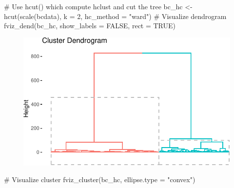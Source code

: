 \documentclass[
  letterpaper,
  DIV=11,
  numbers=noendperiod]{scrreprt}
\newenvironment{Shaded}{\begin{snugshade}}{\end{snugshade}}
\newcommand{\AttributeTok}[1]{\textcolor[rgb]{0.40,0.45,0.13}{#1}}
\newcommand{\CommentTok}[1]{\textcolor[rgb]{0.37,0.37,0.37}{#1}}
\newcommand{\ConstantTok}[1]{\textcolor[rgb]{0.56,0.35,0.01}{#1}}
\newcommand{\DecValTok}[1]{\textcolor[rgb]{0.68,0.00,0.00}{#1}}
\newcommand{\FunctionTok}[1]{\textcolor[rgb]{0.28,0.35,0.67}{#1}}
\newcommand{\NormalTok}[1]{\textcolor[rgb]{0.00,0.23,0.31}{#1}}
\newcommand{\OtherTok}[1]{\textcolor[rgb]{0.00,0.23,0.31}{#1}}
\newcommand{\StringTok}[1]{\textcolor[rgb]{0.13,0.47,0.30}{#1}}
\begin{document}
\begin{Shaded}
\begin{Highlighting}[]
\CommentTok{\# Use hcut() which compute hclust and cut the tree}
\NormalTok{bc\_hc }\OtherTok{\textless{}{-}} \FunctionTok{hcut}\NormalTok{(}\FunctionTok{scale}\NormalTok{(bcdata), }\AttributeTok{k =} \DecValTok{2}\NormalTok{, }\AttributeTok{hc\_method =} \StringTok{"ward"}\NormalTok{)}
\CommentTok{\# Visualize dendrogram}
\FunctionTok{fviz\_dend}\NormalTok{(bc\_hc, }\AttributeTok{show\_labels =} \ConstantTok{FALSE}\NormalTok{, }\AttributeTok{rect =} \ConstantTok{TRUE}\NormalTok{)}
\end{Highlighting}
\end{Shaded}

\begin{figure}[H]

{\centering \includegraphics{./12-clustering_files/figure-pdf/unnamed-chunk-20-1.pdf}

}

\end{figure}

\begin{Shaded}
\begin{Highlighting}[]
\CommentTok{\# Visualize cluster}
\FunctionTok{fviz\_cluster}\NormalTok{(bc\_hc, }\AttributeTok{ellipse.type =} \StringTok{"convex"}\NormalTok{)}
\end{Highlighting}
\end{Shaded}
\end{document}
